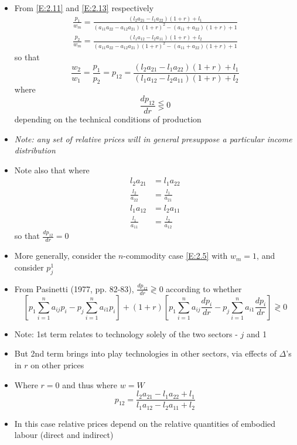 \documentclass{article}
\begin{document}
\begin{itemize}
\begin{figure}[H]
		\end{figure}
		\item From \cref{E:2.11} and \cref{E:2.13} respectively
		\begin{gather*}
			\frac{p_1}{w_m} = \frac{(l_2 a_{21} - l_1 a_{22}) (1+r) + l_1}{(a_{11} a_{22} - a_{12} a_{21}) (1+r)^2 - (a_{11} + a_{22}) (1 + r) + 1} \\
			\frac{p_2}{w_m} = \frac{(l_1 a_{12} - l_2 a_{11}) (1+r) + l_2}{(a_{11} a_{22} - a_{12} a_{21}) (1+r)^2 - (a_{11} + a_{22}) (1 + r) + 1} 
		\end{gather*}
		so that
		\begin{equation}
			\frac{w_2}{w_1} = \frac{p_1}{p_2} = p_{12} = \frac{(l_2 a_{21} - l_1 a_{22}) (1 + r) + l_1}{(l_1 a_{12} - l_2 a_{11}) (1 + r) + l_2} \label{E:2.16}
		\end{equation}
		where
		\begin{equation}
			\frac{dp_{12}}{dr} \lesseqgtr 0 \label{E:2.17}
		\end{equation}
		depending on the technical conditions of production 
		\item \textit{Note: any set of relative prices will in general  presuppose a particular income distribution}
		\item  Note also that where
		\begin{align*}
			l_2 a_{21} &= l_1 a_{22}\\
			\frac{l_2}{a_{22}} & = \frac{l_1}{a_{21}}\\
			l_1 a_{12} &= l_2 a_{11}\\
			\frac{l_1}{a_{11}} & = \frac{l_2}{a_{12}}
		\end{align*}
		so that \( \frac{dp_{12}}{dr} = 0 \)
		\item More generally, consider the \( n \)-commodity case \cref{E:2.5} with \( w_m = 1 \), and consider \( p_j^1 \)
		\item From Pasinetti (1977, pp. 82-83), \( \frac{dp_{12}}{dr} \gtrless 0 \)  according to whether 
		\[
			\left[ p_1 \sum_{i = 1}^{n} a_{ij} p_i - p_j \sum_{i = 1}^{n} a_{i1} p_i \right] + (1+r) \left[ p_1 \sum_{i = 1}^{n} a_{ij} \frac{dp_i}{dr} - p_j \sum_{i = 1}^{n} a_{i1} \frac{dp_i}{dr} \right] \gtrless 0
		\]
		\item Note: 1st term relates to technology solely of the two sectors - \( j \) and 1
		\item But 2nd term brings into play technologies in other sectors, via effects of \( \Delta \)'s in \( r \) on other prices
		\item Where \( r = 0 \) and thus where \( w = W \)
		\begin{equation}
			p_{12} = \frac{l_2 a_{21} - l_1 a_{22} + l_1}{l_1 a_{12} - l_2 a_{11} + l_2} \label{E:2.18}
		\end{equation}
		\item  In this case relative prices depend on the relative quantities of embodied labour (direct and indirect)
	\end{itemize}
\end{document}
